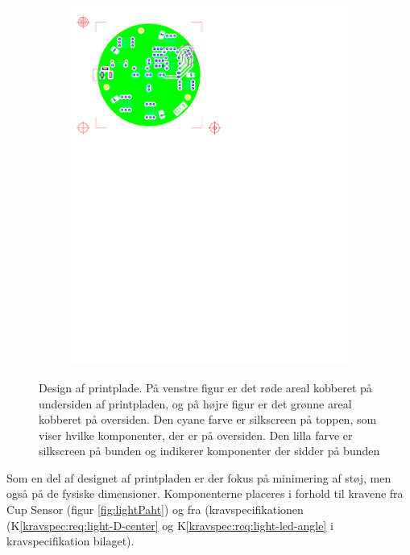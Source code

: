 \documentclass[Rapport/Rapport_main.tex]{subfiles}
\begin{document}
\begin{figure}[H]
{\begin{subfigure}{.55\textwidth}
  \centering
    \includegraphics[width=1\linewidth,trim={0.6in 7.28in 4.5in 0.5in},clip, page=1]{HardwareDesign/CupHolder/graphics/top.pdf}
\end{subfigure}
}
\caption{Design af printplade. På venstre figur er det røde areal kobberet på undersiden af printpladen, og på højre figur er det grønne areal kobberet på oversiden. Den cyane farve er silkscreen på toppen, som viser hvilke komponenter, der er på oversiden. Den lilla farve er silkscreen på bunden og indikerer komponenter der sidder på bunden}
\label{fig:CupHolderPrintpladeDesign}
\end{figure}

Som en del af designet af printpladen er der fokus på minimering af støj, men også på de fysiske dimensioner. Komponenterne placeres i forhold til kravene fra Cup Sensor (figur \ref{fig:lightPaht}) og fra (kravspecifikationen (K\ref{kravspec:req:light-D-center} og K\ref{kravspec:req:light-led-angle} i kravspecifikation bilaget).
\end{document}
